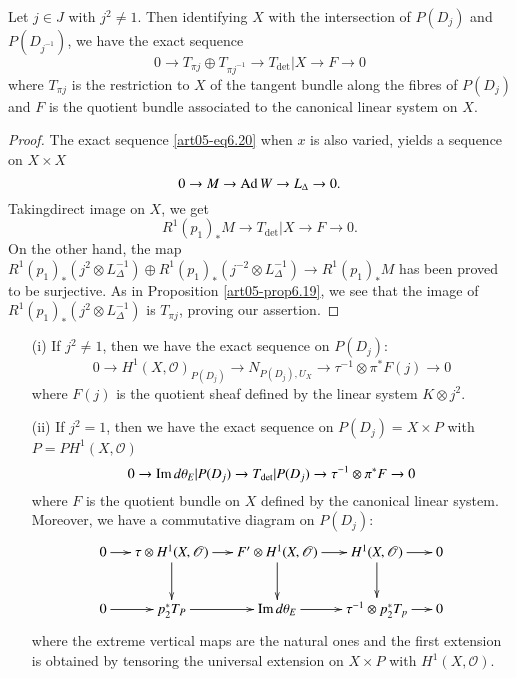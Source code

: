 \setcounter{theorem}{20}
\begin{lemma}\label{art05-lem6.21}
Let $j\in J$ with $j^{2}\neq 1$. Then identifying $X$ with the
intersection of $P(D_{j})$ and $P(D_{j^{-1}})$, we have the exact
sequence
$$
0\to T_{\pi j}\oplus T_{\pi j^{-1}}\to T_{\det}|X\to F\to 0
$$
where $T_{\pi j}$ is the restriction to $X$ of the tangent bundle
along the fibres of $P(D_{j})$ and $F$ is the quotient bundle
associated to the canonical linear system on $X$.
\end{lemma}

\begin{proof}
The exact sequence \ref{art05-eq6.20} when $x$ is also varied, yields
a sequence on $X\times X$
$$
0\to M\to \operatorname{Ad} W\to L_{\Delta}\to 0.
$$
Taking\pageoriginale direct image on $X$, we get
$$
R^{1}(p_{1})_{*}M\to T_{\det}|X\to F\to 0.
$$
On the other hand, the map $R^{1}(p_{1})_{*}(j^{2}\otimes
L^{-1}_{\Delta})\oplus R^{1}(p_{1})_{\ast}(j^{-2}\otimes
L^{-1}_{\Delta})\to R^{1}(p_{1})_{*}M$ has been proved to be
surjective. As in Proposition \ref{art05-prop6.19}, we see that the
image of $R^{1}(p_{1})_{*}(j^{2}\otimes L_{\Delta}^{-1})$ is $T_{\pi
j}$, proving our assertion.
\end{proof}

\begin{lemma}\label{art05-lem6.22}
\begin{itemize}
\item[\rm(i)] If $j^{2}\neq 1$, then we have the exact sequence on
$P(D_{j}):$
$$
0\to H^{1}(X,\mathscr{O})_{P(D_{j})}\to
N_{P(D_{j}),U_{X}}\to \tau^{-1}\otimes \pi^{*}F(j)\to 0
$$
where $F(j)$ is the quotient sheaf defined by the linear system
$K\otimes j^{2}$.

\item[\rm(ii)] If $j^{2}=1$, then we have the exact sequence on
$P(D_{j})=X\times P$ with $P=PH^{1}(X,\mathscr{O})$
$$
0\to \operatorname{Im} d\theta_{E}|P(D_{j})\to
T_{\det}|P(D_{j})\to \tau^{-1}\otimes \pi^{*}F\to 0
$$
where $F$ is the quotient bundle on $X$ defined by the canonical
linear system. Moreover, we have a commutative diagram on $P(D_{j})$:
{\fontsize{10pt}{12pt}\selectfont
\[
\xymatrix@C=.5cm{
0\ar[r] & \tau\otimes H^{1}(X,\mathscr{O})\ar[d]\ar[r] & F'\otimes
H^{1}(X,\mathscr{O})\ar[d]\ar[r] & H^{1}(X,\mathscr{O})\ar[d]\ar[r] &
0\\
0\ar[r] & p^{*}_{2}T_{P}\ar[r] & \Iim d\theta_{E}\ar[r]
& \tau^{-1}\otimes p^{*}_{2}T_{p}\ar[r] & 0
}
\]}
where the extreme vertical maps are the natural ones and the first
extension is obtained by tensoring the universal extension on $X\times
P$ with $H^{1}(X,\mathscr{O})$.
\end{itemize}
\end{lemma}


